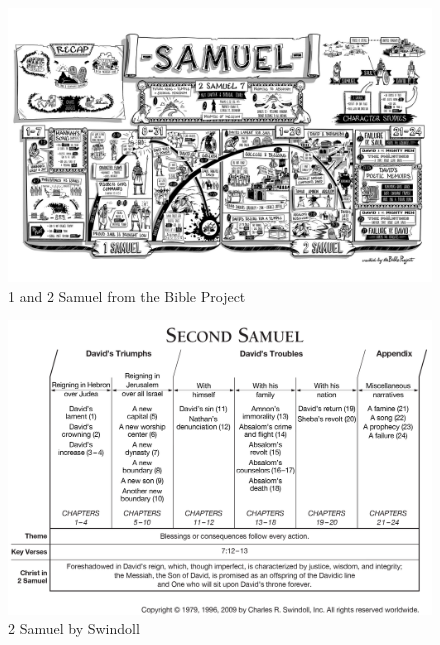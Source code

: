 
\newpage
\begin{figure}
\begin{center}
\includegraphics[scale=0.2, angle=90]{10OT-2Samuel/References/BibleProject-1-2Samuel.jpg}
\caption[1 and 2 Samuel from the Bible Project]{1 and 2 Samuel from the Bible Project}
\label{fig:1 and 2 Samuel from the Bible Project}
\end{center}
\end{figure}

\newpage
\begin{figure}
\begin{center}
\includegraphics[scale=0.275, angle=90]{10OT-2Samuel/References/Swindoll-2Samuel.png}
\caption[2 Samuel by Swindoll]{2 Samuel by Swindoll}
\label{fig:2 Samuel by Swindoll}
\end{center}
\end{figure}

